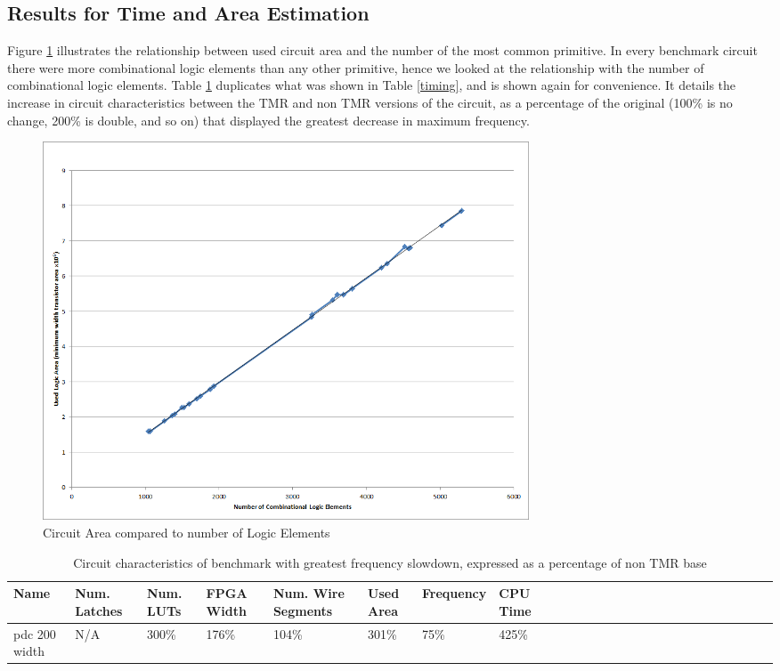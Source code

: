 \documentclass[12pt,final,oneside]{dwThesis} %
\begin{document}
\subsection{Results for Time and Area Estimation}
Figure \ref{AreaVElements} illustrates the relationship between used circuit area and the number of the most common primitive. In every benchmark circuit there were more combinational logic elements than any other primitive, hence we looked at the relationship with the number of combinational logic elements. Table \ref{timing2} duplicates what was shown in Table \ref{timing}, and is shown again for convenience. It details the increase in circuit characteristics between the \ac{TMR} and non \ac{TMR} versions of the circuit, as a percentage of the original (100\% is no change, 200\% is double, and so on) that displayed the greatest decrease in maximum frequency.
\begin{figure}
    \begin{center}
        \includegraphics[width=0.7\textwidth]{images/area-v-elements.png}
        \caption{Circuit Area compared to number of Logic Elements}
        \label{AreaVElements}
    \end{center}
\end{figure}


\begin{table}
    \begin{adjustwidth}{-1cm}{-1cm}
        \begin{tabularx}{1.1\textwidth}{XXXXXXXXXXXXXXXXXXXXXXXXXX}
           \toprule
            Name & Num. Latches & Num. \acp{LUT} & FPGA Width & Num. Wire Segments & Used Area & Frequency & CPU Time\\
            \midrule
pdc 200 width   & N/A   & 300\% & 176\% & 104\% & 301\% &  75\% & 425\%\\
          \bottomrule
        \end{tabularx}
        \caption{Circuit characteristics of benchmark with greatest frequency slowdown, expressed as a percentage of non \ac{TMR} base}
        \label{timing2}
    \end{adjustwidth}
\end{table}
\end{document}
